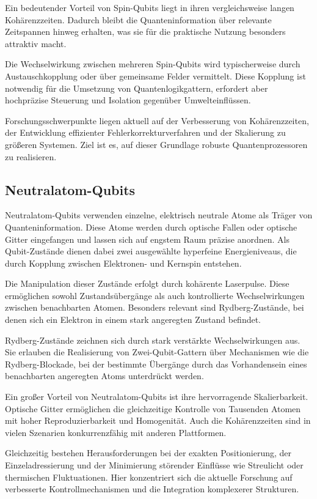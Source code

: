 Ein bedeutender Vorteil von Spin-Qubits liegt in ihren vergleichsweise langen Kohärenzzeiten. Dadurch bleibt die Quanteninformation über relevante Zeitspannen hinweg erhalten, was sie für die praktische Nutzung besonders attraktiv macht.

Die Wechselwirkung zwischen mehreren Spin-Qubits wird typischerweise durch Austauschkopplung oder über gemeinsame Felder vermittelt. Diese Kopplung ist notwendig für die Umsetzung von Quantenlogikgattern, erfordert aber hochpräzise Steuerung und Isolation gegenüber Umwelteinflüssen.

Forschungsschwerpunkte liegen aktuell auf der Verbesserung von Kohärenzzeiten, der Entwicklung effizienter Fehlerkorrekturverfahren und der Skalierung zu größeren Systemen. Ziel ist es, auf dieser Grundlage robuste Quantenprozessoren zu realisieren.

\subsection{Neutralatom-Qubits}
\label{subsec: Neutralatom-Qubits}
Neutralatom-Qubits verwenden einzelne, elektrisch neutrale Atome als Träger von Quanteninformation. Diese Atome werden durch optische Fallen oder optische Gitter eingefangen und lassen sich auf engstem Raum präzise anordnen. Als Qubit-Zustände dienen dabei zwei ausgewählte hyperfeine Energieniveaus, die durch Kopplung zwischen Elektronen- und Kernspin entstehen.

Die Manipulation dieser Zustände erfolgt durch kohärente Laserpulse. Diese ermöglichen sowohl Zustandsübergänge als auch kontrollierte Wechselwirkungen zwischen benachbarten Atomen. Besonders relevant sind Rydberg-Zustände, bei denen sich ein Elektron in einem stark angeregten Zustand befindet.

Rydberg-Zustände zeichnen sich durch stark verstärkte Wechselwirkungen aus. Sie erlauben die Realisierung von Zwei-Qubit-Gattern über Mechanismen wie die Rydberg-Blockade, bei der bestimmte Übergänge durch das Vorhandensein eines benachbarten angeregten Atoms unterdrückt werden.

Ein großer Vorteil von Neutralatom-Qubits ist ihre hervorragende Skalierbarkeit. Optische Gitter ermöglichen die gleichzeitige Kontrolle von Tausenden Atomen mit hoher Reproduzierbarkeit und Homogenität. Auch die Kohärenzzeiten sind in vielen Szenarien konkurrenzfähig mit anderen Plattformen.

Gleichzeitig bestehen Herausforderungen bei der exakten Positionierung, der Einzeladressierung und der Minimierung störender Einflüsse wie Streulicht oder thermischen Fluktuationen. Hier konzentriert sich die aktuelle Forschung auf verbesserte Kontrollmechanismen und die Integration komplexerer Strukturen.

